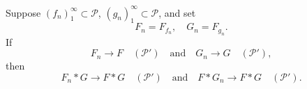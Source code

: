 Suppose $(f_n)_{1}^{\infty} \subset \mathcal{P}$, $(g_n)_{1}^{\infty} \subset \mathcal{P}$, and set
$$F_n = F_{f_n}, \quad G_n = F_{g_n}.$$
If
$$F_n \to F \quad (\mathcal{P}') \quad \text{and} \quad G_n \to G \quad (\mathcal{P}'),$$
then
$$F_n * G \to F * G \quad (\mathcal{P}') \quad \text{and} \quad F * G_n \to F * G \quad (\mathcal{P}').$$
